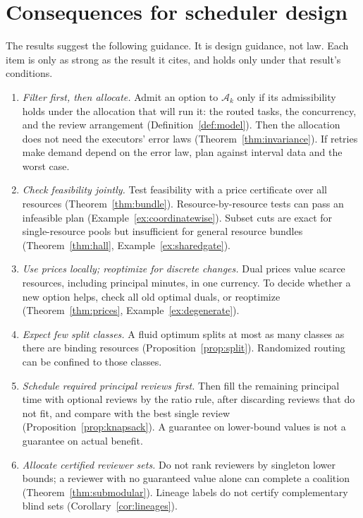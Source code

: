 \documentclass[11pt]{article}
\theoremstyle{definition}
\theoremstyle{remark}
\begin{document}
\section{Consequences for scheduler design}\label{sec:design}
The results suggest the following guidance. It is design guidance, not law. Each item is only as strong
as the result it cites, and holds only under that result's conditions.
\begin{enumerate}[leftmargin=*,itemsep=3pt]
\item \emph{Filter first, then allocate.} Admit an option to $\mathcal A_k$ only if its admissibility
holds under the allocation that will run it: the routed tasks, the concurrency, and the review
arrangement (Definition~\ref{def:model}). Then the allocation does not need the executors' error laws
(Theorem~\ref{thm:invariance}). If retries make demand depend on the error law, plan against interval
data and the worst case.
\item \emph{Check feasibility jointly.} Test feasibility with a price certificate over all resources
(Theorem~\ref{thm:bundle}). Resource-by-resource tests can pass an infeasible plan
(Example~\ref{ex:coordinatewise}). Subset cuts are exact for single-resource pools but insufficient for general resource bundles
(Theorem~\ref{thm:hall}, Example~\ref{ex:sharedgate}).
\item \emph{Use prices locally; reoptimize for discrete changes.} Dual prices value scarce resources,
including principal minutes, in one currency. To decide whether a new option helps, check all old
optimal duals, or reoptimize (Theorem~\ref{thm:prices}, Example~\ref{ex:degenerate}).
\item \emph{Expect few split classes.} A fluid optimum splits at most as many classes as there are
binding resources (Proposition~\ref{prop:split}). Randomized routing can be confined to those classes.
\item \emph{Schedule required principal reviews first.} Then fill the remaining principal time with
optional reviews by the ratio rule, after discarding reviews that do not fit, and compare with the best
single review (Proposition~\ref{prop:knapsack}). A guarantee on lower-bound values is not a guarantee on
actual benefit.
\item \emph{Allocate certified reviewer sets.} Do not rank reviewers by singleton lower bounds; a
reviewer with no guaranteed value alone can complete a coalition (Theorem~\ref{thm:submodular}).
Lineage labels do not certify complementary blind sets (Corollary~\ref{cor:lineages}).

\end{enumerate}
\end{document}
